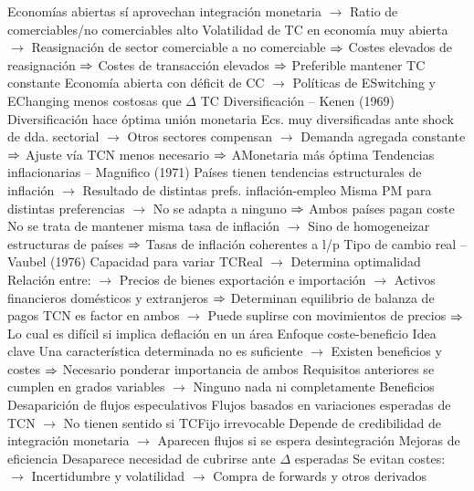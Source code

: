 \documentclass{nuevotema}
\begin{document}
\begin{esquemal}
				\4 Economías abiertas sí aprovechan integración monetaria
				\4[] $\to$ Ratio de comerciables/no comerciables alto
				\4 Volatilidad de TC en economía muy abierta
				\4[] $\to$ Reasignación de sector comerciable a no comerciable
				\4[] $\Rightarrow$ Costes elevados de reasignación
				\4[] $\Rightarrow$ Costes de transacción elevados
				\4[] $\Rightarrow$ Preferible mantener TC constante
				\4 Economía abierta con déficit de CC
				\4[] $\to$ Políticas de ESwitching y EChanging menos costosas que $\Delta$ TC
			\3 Diversificación -- Kenen (1969)
				\4 Diversificación hace óptima unión monetaria
				\4 Ecs. muy diversificadas ante shock de dda. sectorial
				\4[] $\to$ Otros sectores compensan
				\4[] $\to$ Demanda agregada constante
				\4[] $\Rightarrow$ Ajuste vía TCN menos necesario
				\4[] $\Rightarrow$ AMonetaria más óptima
			\3 Tendencias inflacionarias -- Magnifico (1971)
				\4[] Países tienen tendencias estructurales de inflación
				\4[] $\to$ Resultado de distintas prefs. inflación-empleo
				\4 Misma PM para distintas preferencias
				\4[] $\to$ No se adapta a ninguno
				\4[] $\Rightarrow$ Ambos países pagan coste
				\4 No se trata de mantener misma tasa de inflación
				\4[] $\to$ Sino de homogeneizar estructuras de países
				\4[] $\Rightarrow$ Tasas de inflación coherentes a l/p
			\3 Tipo de cambio real -- Vaubel (1976)
				\4 Capacidad para variar TCReal
				\4[] $\to$ Determina optimalidad
				\4 Relación entre:
				\4[] $\to$ Precios de bienes exportación e importación
				\4[] $\to$ Activos financieros domésticos y extranjeros
				\4[] $\Rightarrow$ Determinan equilibrio de balanza de pagos
				\4 TCN es factor en ambos
				\4[] $\to$ Puede suplirse con movimientos de precios
				\4[] $\Rightarrow$ Lo cual es difícil si implica deflación en un área
		\2 Enfoque coste-beneficio
			\3 Idea clave
				\4[] Una característica determinada no es suficiente
				\4[] $\to$ Existen beneficios y costes
				\4[] $\Rightarrow$ Necesario ponderar importancia de ambos
				\4[] Requisitos anteriores se cumplen en grados variables
				\4[] $\to$ Ninguno nada ni completamente
			\3 Beneficios
				\4[\textsc{i}] Desaparición de flujos especulativos
				\4[] Flujos basados en variaciones esperadas de TCN
				\4[] $\to$ No tienen sentido si TCFijo irrevocable
				\4[] Depende de credibilidad de integración monetaria
				\4[] $\to$ Aparecen flujos si se espera desintegración
				\4[\textsc{ii}] Mejoras de eficiencia
				\4[] Desaparece necesidad de cubrirse ante $\Delta$ esperadas
				\4[] Se evitan costes:
				\4[] $\to$ Incertidumbre y volatilidad
				\4[] $\to$ Compra de forwards y otros derivados

\end{esquemal}
\end{document}
